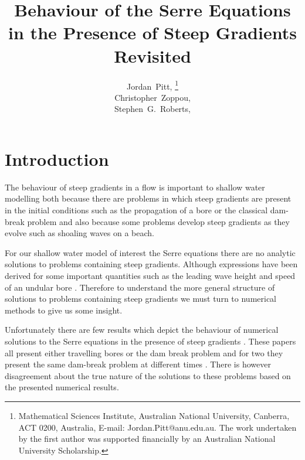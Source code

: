 \documentclass[SingleSpace,12pt,Journal]{Serre_ASCE}
\begin{document}
\title{Behaviour of the Serre Equations in the Presence of Steep Gradients Revisited}

\author{
Jordan~Pitt,%
\thanks{Mathematical Sciences Institute, Australian National University, Canberra, ACT 0200, Australia, E-mail: Jordan.Pitt@anu.edu.au. The work undertaken by the first author was supported financially by an Australian National University Scholarship.}
\\
Christopher~Zoppou,\footnotemark[1]%
%
\\
Stephen~G.~Roberts,\footnotemark[1]
}

\maketitle

\begin{abstract}

\end{abstract}


\linenumbers

\section{Introduction} \label{intro} 
The behaviour of steep gradients in a flow is important to shallow water modelling both because there are problems in which steep gradients are present in the initial conditions such as the propagation of a bore or the classical dam-break problem and also because some problems develop steep gradients as they evolve such as shoaling waves on a beach. 

For our shallow water model of interest the Serre equations there are no analytic solutions to problems containing steep gradients. Although expressions have been derived for some important quantities such as the leading wave height and speed of an undular bore \cite{El-etal-2006}. Therefore to understand the more general structure of solutions to problems containing steep gradients we must turn to numerical methods to give us some insight. 

Unfortunately there are few results which depict the behaviour of numerical solutions to the Serre equations in the presence of steep gradients \cite{El-etal-2006,Hank-etal-2010-2034,Mitsotakis-etal-2014,Dutykh-2014-315}. These papers all present either travelling bores or the dam break problem and for two they present the same dam-break problem at different times \cite{El-etal-2006,Hank-etal-2010-2034}. There is however disagreement about the true nature of the solutions to these problems based on the presented numerical results. 
\end{document}
